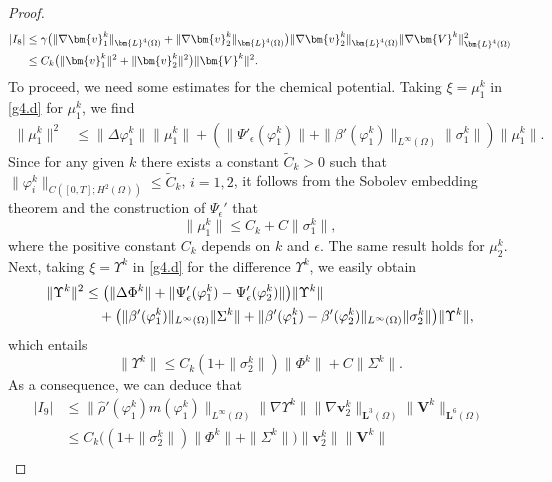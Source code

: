 \documentclass[11pt,reqno]{amsart}
\def\vv{\bm{v}}
\begin{document}
\begin{proof}
%
\begin{align}
|I_8|
&\leq \gamma \big(\|\nabla \bm{v}^k_1\|_{\bm{L}^4(\Omega)} +\|\nabla \bm{v}^k_2\|_{\bm{L}^4(\Omega)}\big)\|\nabla \vv^k_2\|_{\bm{L}^4(\Omega)}\| \nabla\bm{V}^k\|^2_{\bm{L}^4(\Omega)}
\notag\\
&\leq C_k\big(\| \bm{v}^k_1\|^2 +\| \bm{v}^k_2\|^2\big) \| \bm{V}^k\|^2.
\notag
\end{align}
%
To proceed, we need some estimates for the chemical potential.
Taking $\xi=\mu_1^k$ in \eqref{g4.d} for $\mu_1^k$, we find
%
\begin{align*}
\| \mu_1^k\|^2
&\leq   \| \Delta\varphi_1^k \|  \| \mu_1^k\| + \left( \| \Psi'_\epsilon(\varphi_1^k) \| + \|\beta'(\varphi^k_1)\|_{L^\infty(\Omega)} \| \sigma_1^k\| \right) \| \mu_1^k\|.
\end{align*}
%
Since for any given $k$ there exists a constant $\widetilde{C}_k>0$ such that $\| \varphi_i^k \|_{C([0,T]; H^2(\Omega))}\leq \widetilde{C}_k$, $i=1,2$, it follows from the Sobolev embedding theorem and the construction of $\Psi_\epsilon'$ that
%
\begin{equation}
\label{muk-1}
\| \mu_1^k\|\leq  C_k+ C \| \sigma_1^k\|,
\end{equation}
%
where the positive constant $C_k$ depends on $k$ and $\epsilon$.
The same result holds for $\mu_2^k$. Next, taking $\xi=\Upsilon^k$ in \eqref{g4.d} for the difference $\Upsilon^k$, we easily obtain
%
\begin{align}
\| \Upsilon^k\|^2
&\leq   \big( \| \Delta \Phi^k \|
+ \| \Psi'_\epsilon(\varphi_1^k) - \Psi'_\epsilon(\varphi_2^k)\|\big) \| \Upsilon^k\|
\notag\\
&\quad +  \big( \|\beta'(\varphi^k_1)\|_{L^\infty(\Omega)}\| \Sigma^k\|
+ \|\beta'(\varphi^k_1)-\beta'(\varphi^k_2)\|_{L^\infty(\Omega)}\| \sigma^k_2\| \big) \| \Upsilon^k\|,
\notag
\end{align}
%
which entails
%
\begin{equation}
\label{muk-dif}
\| \Upsilon^k\|\leq  C_k (1+\| \sigma^k_2\|)\| \Phi^k\| + C \| \Sigma^k\|.
\end{equation}
%
As a consequence, we can deduce that
\begin{align*}
|I_9|
&\leq \|\widehat{\rho}'(\varphi_1^k) m(\varphi_1^k)\|_{L^\infty(\Omega)} \|\nabla \Upsilon ^k\| \|\nabla \vv_2^k\|_{\bm{L}^3(\Omega)} \|\bm{V}^k\|_{\bm{L}^6(\Omega)}
\\
&\leq C_k\big((1+\| \sigma^k_2\|)\| \Phi^k\|
+ \| \Sigma^k\|\big) \|\bm{v}^k_2\| \|\bm{V}^k\|
\\

\end{align*}
\end{proof}
\end{document}
